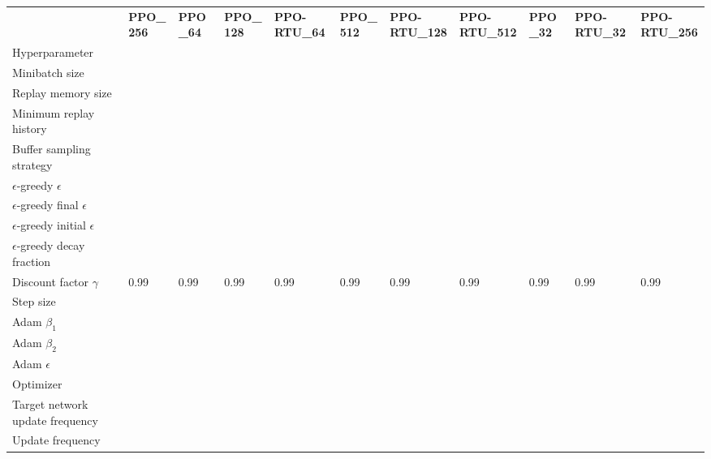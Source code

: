 \begin{tabular}{lllllllllll}
 & \bfseries PPO_256 & \bfseries PPO_64 & \bfseries PPO_128 & \bfseries PPO-RTU_64 & \bfseries PPO_512 & \bfseries PPO-RTU_128 & \bfseries PPO-RTU_512 & \bfseries PPO_32 & \bfseries PPO-RTU_32 & \bfseries PPO-RTU_256 \\
Hyperparameter &  &  &  &  &  &  &  &  &  &  \\
Minibatch size &  &  &  &  &  &  &  &  &  &  \\
Replay memory size &  &  &  &  &  &  &  &  &  &  \\
Minimum replay history &  &  &  &  &  &  &  &  &  &  \\
Buffer sampling strategy &  &  &  &  &  &  &  &  &  &  \\
$\epsilon$-greedy $\epsilon$ &  &  &  &  &  &  &  &  &  &  \\
$\epsilon$-greedy final $\epsilon$ &  &  &  &  &  &  &  &  &  &  \\
$\epsilon$-greedy initial $\epsilon$ &  &  &  &  &  &  &  &  &  &  \\
$\epsilon$-greedy decay fraction &  &  &  &  &  &  &  &  &  &  \\
Discount factor $\gamma$ & 0.99 & 0.99 & 0.99 & 0.99 & 0.99 & 0.99 & 0.99 & 0.99 & 0.99 & 0.99 \\
Step size &  &  &  &  &  &  &  &  &  &  \\
Adam $\beta_1$ &  &  &  &  &  &  &  &  &  &  \\
Adam $\beta_2$ &  &  &  &  &  &  &  &  &  &  \\
Adam $\epsilon$ &  &  &  &  &  &  &  &  &  &  \\
Optimizer &  &  &  &  &  &  &  &  &  &  \\
Target network update frequency &  &  &  &  &  &  &  &  &  &  \\
Update frequency &  &  &  &  &  &  &  &  &  &  \\
\end{tabular}
